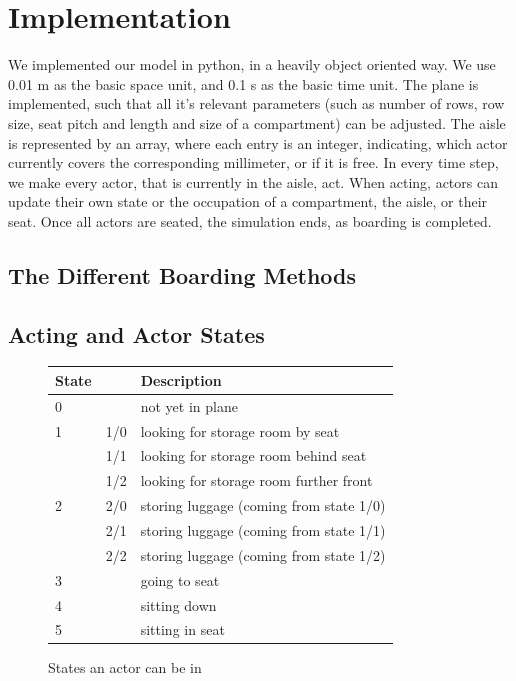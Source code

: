 \documentclass[11pt]{article}
\begin{document}
\section{Implementation}

We implemented our model in python, in a heavily object oriented way. We use 0.01 m as the basic space unit, and 0.1 s as the basic time unit. The plane is implemented, such that all it's relevant parameters (such as number of rows, row size, seat pitch and length and size of a compartment) can be adjusted. The aisle is represented by an array, where each entry is an integer, indicating, which actor currently covers the corresponding millimeter, or if it is free. In every time step, we make every actor, that is currently in the aisle, act. When acting, actors can update their own state or the occupation of a compartment, the aisle, or their seat. Once  all actors are seated, the simulation ends, as boarding is completed.

\subsection{The Different Boarding Methods}

\subsection{Acting and Actor States}
\begin{figure}[h!]
	\center
\begin{tabular}{|ll|l|}
	\hline
	State & &Description\\
	\hline
0 &     & not yet in plane                        \\
\hline
1 & 1/0 & looking for storage room by seat        \\
  & 1/1 & looking for storage room behind seat    \\
  & 1/2 & looking for storage room further front  \\
  \hline
2 & 2/0 & storing luggage (coming from state 1/0) \\
  & 2/1 & storing luggage (coming from state 1/1) \\
  & 2/2 & storing luggage (coming from state 1/2) \\
  \hline
3 &     & going to seat                           \\
\hline
4 &     & sitting down                            \\
\hline
5 &     & sitting in seat       \\                 
\hline

\end{tabular}
\caption{States an actor can be in}
\label{tab:states}
\end{figure}
\end{document}
